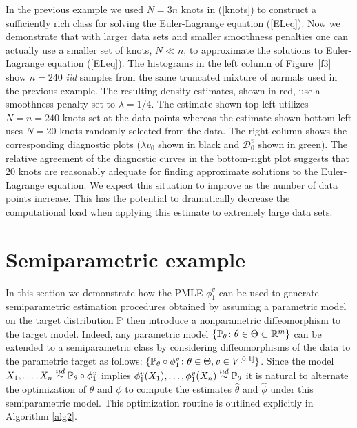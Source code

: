 \documentclass[noinfoline]{imsart}
\begin{document}
 
In the previous example we used $N=3n$ knots in (\ref{knots}) to construct a sufficiently rich class for solving the Euler-Lagrange equation (\ref{ELeq}). Now we demonstrate that with larger data sets and smaller smoothness penalties one can actually use a smaller set of knots, $N\ll n$, to approximate the solutions to Euler-Lagrange equation (\ref{ELeq}). The histograms in the left column of Figure~\ref{f3} show $n=240$ {\em iid}  samples from the same truncated mixture of normals used in the previous example. The resulting density estimates, shown in red,  use a smoothness penalty set to $\lambda=1/4$. The estimate shown top-left  utilizes  $N=n=240$ knots set at the data points whereas the estimate shown bottom-left  uses $N=20$ knots randomly selected from the data.  The right column 
shows the corresponding diagnostic plots ($\lambda v_0$ shown in black  and $\mathcal D_0^v$ shown in green). The relative agreement of the diagnostic curves in the bottom-right plot suggests that 20 knots are reasonably adequate for finding approximate solutions to the Euler-Lagrange equation. We expect this situation to improve as the number of data points increase. This has the potential to dramatically decrease the computational load when applying this estimate to extremely large data sets. 






\section{Semiparametric example} 
\label{spe}

In this section we demonstrate how the PMLE $\phi_1^{\hat v}$ can be used to generate semiparametric estimation procedures obtained by assuming a parametric model on the target distribution $\Bbb P$ then introduce a nonparametric diffeomorphism to the target model. 
Indeed, any parametric model $\{\Bbb P_\theta\colon \theta\in \Theta\subset \Bbb R^m\}$ can  be extended to a   semiparametric class by considering diffeomorphisms of the data to the parametric target as follows: $\{\Bbb P_\theta \circ \phi^{v}_1 \colon \theta\in \Theta, v\in V^{[0,1]}\}$.
Since the  model $X_1,\ldots, X_n\overset{iid}\sim \Bbb P_\theta\circ \phi^v_1$ implies $\phi^v_1(X_1),\ldots, \phi_1^v(X_n)\overset{iid}\sim \Bbb P_\theta$ it is natural to alternate the optimization of $\theta$ and $\phi$ to compute the estimates $\hat \theta$ and $\hat \phi$ under this semiparametric model. This optimization routine is outlined explicitly in Algorithm \ref{alg2}.
\end{document}
